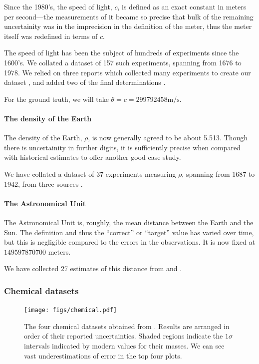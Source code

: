 \documentclass[12pt]{article}
\begin{document}
Since the 1980's, the speed of light, $c$, is defined as an exact constant in meters per second---the measurements of it became so precise that bulk of the remaining uncertainity was in the imprecision in the definition of the meter, thus the meter itself was redefined in terms of $c$.

The speed of light has been the subject of hundreds of experiments since the 1600's. We collated a dataset of 157 such experiments, spanning from 1676 to 1978. We relied on three reports which collected many experiments to create our dataset \citep{birge1934velocity,froome1971velocity,raynaud2013determining}, and added two of the final determinations \citep{evenson1972speed,blaney1974measurement}.

For the ground truth, we will take $\theta=c=299792458\mathrm{m}/\mathrm{s}$.

\paragraph{The density of the Earth}

The density of the Earth, $\rho$, is now generally agreed to be about 5.513. Though there is uncertainity in further digits, it is sufficiently precise when compared with historical estimates to offer another good case study.

We have collated a dataset of 37 experiments measuring $\rho$, spanning from 1687 to 1942, from three sources \citep{burgess1902value,sagitov1970current,hughes2006mean}.

\paragraph{The Astronomical Unit}

The Astronomical Unit is, roughly, the mean distance between the Earth and the Sun. The definition and thus the ``correct'' or ``target'' value has varied over time, but this is negligible compared to the errors in the observations. It is now fixed at $149597870700$ meters.

We have collected 27 estimates of this distance from \citet{atkins1964determination} and \citet{standish2004astronomical}.

\subsubsection{Chemical datasets}

\begin{figure}
  \texttt{[image: figs/chemical.pdf]}
  \caption{The four chemical datasets obtained from \citet{clarke1910recalculation}. Results are arranged in order of their reported uncertainties. Shaded regions indicate the $1\sigma$ intervals indicated by modern values for their masses. We can see vast underestimations of error in the top four plots.}
  \label{fig:chemical}
\end{figure}
\end{document}
